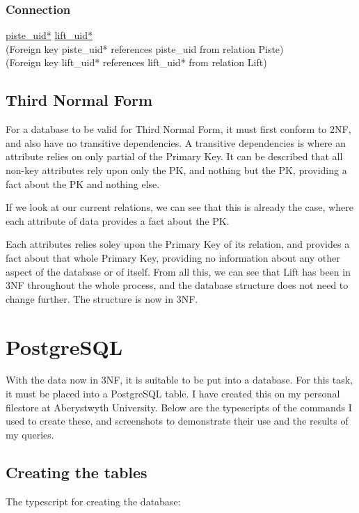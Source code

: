 \documentclass[11pt]{scrartcl} %
\begin{document}
\subsubsection{Connection}
\underline{piste\_uid*}\newline
\underline{lift\_uid*}\\[0.3cm]
(Foreign key piste\_uid* references piste\_uid from relation Piste)\\
(Foreign key lift\_uid* references lift\_uid* from relation Lift)

\subsection{Third Normal Form}
For a database to be valid for Third Normal Form, it must first conform to 2NF, and also have no transitive dependencies. A transitive dependencies is where an attribute relies on only partial of the Primary Key. It can be described that all non-key attributes rely upon only the PK, and nothing but the PK, providing a fact about the PK and nothing else. 

If we look at our current relations, we can see that this is already the case, where each attribute of data provides a fact about the PK.

Each attributes relies soley upon the Primary Key of its relation, and provides a fact about that whole Primary Key, providing no information about any other aspect of the database or of itself. From all this, we can see that Lift has been in 3NF throughout the whole process, and the database structure does not need to change further. The structure is now in 3NF.

\newpage

\section{PostgreSQL}
With the data now in 3NF, it is suitable to be put into a database. For this task, it must be placed into a PostgreSQL table. I have created this on my personal filestore at Aberystwyth University. Below are the typescripts of the commands I used to create these, and screenshots to demonstrate their use and the results of my queries.

\subsection{Creating the tables}
The typescript for creating the database:
\end{document}
